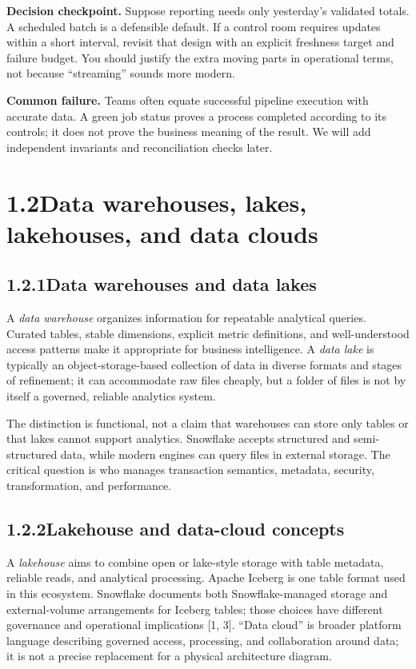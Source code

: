 \documentclass[11pt,twoside]{article}
\newcommand{\topic}[2]{\subsection*{#1\quad #2}}
\begin{document}
\textbf{Decision checkpoint.} Suppose reporting needs only yesterday's validated totals. A scheduled batch is a defensible default. If a control room requires updates within a short interval, revisit that design with an explicit freshness target and failure budget. You should justify the extra moving parts in operational terms, not because ``streaming'' sounds more modern.

\textbf{Common failure.} Teams often equate successful pipeline execution with accurate data. A green job status proves a process completed according to its controls; it does not prove the business meaning of the result. We will add independent invariants and reconciliation checks later.

\section*{1.2\quad Data warehouses, lakes, lakehouses, and data clouds}
\topic{1.2.1}{Data warehouses and data lakes}
A \emph{data warehouse} organizes information for repeatable analytical queries. Curated tables, stable dimensions, explicit metric definitions, and well-understood access patterns make it appropriate for business intelligence. A \emph{data lake} is typically an object-storage-based collection of data in diverse formats and stages of refinement; it can accommodate raw files cheaply, but a folder of files is not by itself a governed, reliable analytics system.

The distinction is functional, not a claim that warehouses can store only tables or that lakes cannot support analytics. Snowflake accepts structured and semi-structured data, while modern engines can query files in external storage. The critical question is who manages transaction semantics, metadata, security, transformation, and performance.

\topic{1.2.2}{Lakehouse and data-cloud concepts}
A \emph{lakehouse} aims to combine open or lake-style storage with table metadata, reliable reads, and analytical processing. Apache Iceberg is one table format used in this ecosystem. Snowflake documents both Snowflake-managed storage and external-volume arrangements for Iceberg tables; those choices have different governance and operational implications [1, 3]. ``Data cloud'' is broader platform language describing governed access, processing, and collaboration around data; it is not a precise replacement for a physical architecture diagram.
\end{document}
